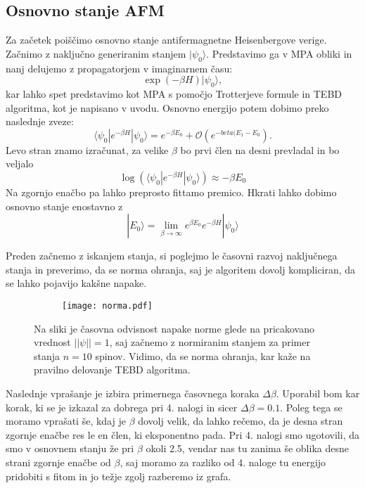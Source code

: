 \documentclass{article}
\begin{document}
\subsection*{Osnovno stanje AFM}

Za začetek poiščimo osnovno stanje antifermagnetne Heisenbergove verige.
Začnimo z naključno generiranim stanjem $|\psi_0 \rangle$. Predstavimo ga v MPA obliki in nanj delujemo z propagatorjem v imaginarnem času:
\begin{equation*}
\exp(-\beta H) | \psi_0 \rangle ,
\end{equation*}
kar lahko spet predstavimo kot MPA s pomočjo Trotterjeve formule in TEBD algoritma, kot je napisano v uvodu. 
Osnovno energijo potem dobimo preko naslednje zveze:
\begin{equation*}
\langle \psi_0 | e^{-\beta H} | \psi_0 \rangle = e^{- \beta E_0} + \mathcal{O}(e^{-beta(E_1-E_0}).
\end{equation*}
Levo stran znamo izračunat, za velike $\beta$ bo prvi člen na desni prevladal in bo veljalo
\begin{equation*}
\log(\langle \psi_0 | e^{-\beta H} | \psi_0 \rangle ) \approx -\beta E_0
\end{equation*}
Na zgornjo enačbo pa lahko preprosto fittamo premico. 
Hkrati lahko dobimo osnovno stanje enostavno z
\begin{equation*}
|E_0 \rangle = \lim_{\beta \to \infty} e^{\beta E_0} e^{-\beta H} |\psi_0 \rangle 
\end{equation*}

Preden začnemo z iskanjem stanja, si poglejmo le časovni razvoj naključnega stanja in preverimo, da se norma ohranja, saj je algoritem dovolj kompliciran, da se lahko pojavijo kakšne napake.

\begin{figure}[H]
\centering
\begin{subfigure}{.7\textwidth}
\texttt{[image: norma.pdf]}
\end{subfigure}
\caption*{Na sliki je časovna odvisnost napake norme glede na pricakovano vrednost $||\psi||=1$, saj začnemo z normiranim stanjem za primer stanja $n=10$ spinov. Vidimo, da se norma ohranja, kar kaže na pravilno delovanje TEBD algoritma.}
\end{figure}

Naslednje vprašanje je izbira primernega časovnega koraka $\Delta \beta$. Uporabil bom kar korak, ki se je izkazal za dobrega pri 4. nalogi in sicer $\Delta \beta = 0.1$.
Poleg tega se moramo vprašati še, kdaj  je $\beta$ dovolj velik, da lahko rečemo, da je desna stran zgornje enačbe res le en člen, ki eksponentno pada.
Pri 4. nalogi smo ugotovili, da smo v osnovnem stanju že pri $\beta$ okoli 2.5, vendar nas tu zanima še oblika desne strani zgornje enačbe od $\beta$, saj moramo za razliko od 4. naloge tu energijo pridobiti s fitom in jo težje zgolj razberemo iz grafa.
\end{document}

